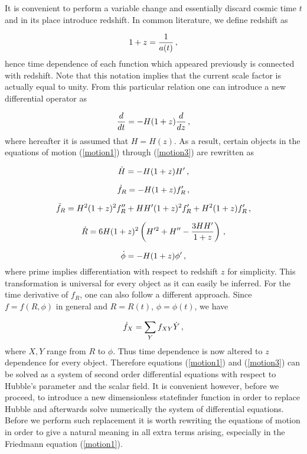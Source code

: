\documentclass[aps,prd,twocolumn,groupedaddress,showpacs,nofootinbib,amssymb]{revtex4-2}
\begin{document}
It is convenient to perform a variable change and essentially discard cosmic time $t$ and in its place introduce redshift. In common literature, we define redshift as

\begin{equation}
\centering
\label{z}
1+z=\frac{1}{a(t)}\, ,
\end{equation}
hence time dependence of each function which appeared previously is connected with redshift. Note that this notation implies that the current scale factor is actually equal to unity. From this particular relation one can introduce a new differential operator as

\begin{equation}
\centering
\label{dz}
\frac{d}{dt}=-H(1+z)\frac{d}{dz}\, ,
\end{equation}
where hereafter it is assumed that $H=H(z)$. As a result, certain objects in the equations of motion (\ref{motion1}) through (\ref{motion3}) are rewritten as 

\begin{equation}
\centering
\label{dotH}
\dot H=-H(1+z)H'\, ,
\end{equation}

\begin{equation}
\centering
\label{dotfR}
\dot f_R=-H(1+z)f_R'\, ,
\end{equation}

\begin{equation}
\centering
\label{ddotfR}
\ddot f_R=H^2(1+z)^2f_R''+HH'(1+z)^2f_R'+H^2(1+z)f_R'\, ,
\end{equation}

\begin{equation}
\centering
\label{dotR}
\dot R=6H(1+z)^2\left(H'^2+H''-\frac{3HH'}{1+z}\right)\, ,
\end{equation}

\begin{equation}
\centering
\label{dotphi}
\dot\phi=-H(1+z)\phi'\, ,
\end{equation}
where prime implies differentiation with respect to redshift $z$ for simplicity. This transformation is universal for every object as it can easily be inferred. For the time derivative of $f_R$, one can also follow a different approach. Since $f=f(R,\phi)$ in general and $R=R(t)$, $\phi=\phi(t)$, we have

\begin{equation}
\centering
\label{dotf}
\dot f_X=\sum_{Y}f_{XY}\dot Y\, ,
\end{equation}
where $X,Y$ range from $R$ to $\phi$. Thus time dependence is now altered to $z$ dependence for every object. Therefore equations (\ref{motion1}) and (\ref{motion3}) can be solved as a system of second order differential equations with respect to Hubble's parameter and the scalar field. It is convenient however, before we proceed, to introduce a new dimensionless statefinder function in order to replace Hubble and afterwards solve numerically the system of differential equations. Before we perform such replacement it is worth rewriting the equations of motion in order to give a natural meaning in all extra terms arising, especially in the Friedmann equation (\ref{motion1}). 
\end{document}
